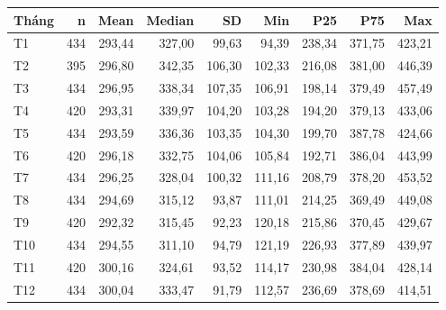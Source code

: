 \begin{tabular}{lrrrrrrrr}
\toprule
Tháng & n & Mean & Median & SD & Min & P25 & P75 & Max \\
\midrule
T1 & 434 & 293{,}44 & 327{,}00 & 99{,}63 & 94{,}39 & 238{,}34 & 371{,}75 & 423{,}21 \\
T2 & 395 & 296{,}80 & 342{,}35 & 106{,}30 & 102{,}33 & 216{,}08 & 381{,}00 & 446{,}39 \\
T3 & 434 & 296{,}95 & 338{,}34 & 107{,}35 & 106{,}91 & 198{,}14 & 379{,}49 & 457{,}49 \\
T4 & 420 & 293{,}31 & 339{,}97 & 104{,}20 & 103{,}28 & 194{,}20 & 379{,}13 & 433{,}06 \\
T5 & 434 & 293{,}59 & 336{,}36 & 103{,}35 & 104{,}30 & 199{,}70 & 387{,}78 & 424{,}66 \\
T6 & 420 & 296{,}18 & 332{,}75 & 104{,}06 & 105{,}84 & 192{,}71 & 386{,}04 & 443{,}99 \\
T7 & 434 & 296{,}25 & 328{,}04 & 100{,}32 & 111{,}16 & 208{,}79 & 378{,}20 & 453{,}52 \\
T8 & 434 & 294{,}69 & 315{,}12 & 93{,}87 & 111{,}01 & 214{,}25 & 369{,}49 & 449{,}08 \\
T9 & 420 & 292{,}32 & 315{,}45 & 92{,}23 & 120{,}18 & 215{,}86 & 370{,}45 & 429{,}67 \\
T10 & 434 & 294{,}55 & 311{,}10 & 94{,}79 & 121{,}19 & 226{,}93 & 377{,}89 & 439{,}97 \\
T11 & 420 & 300{,}16 & 324{,}61 & 93{,}52 & 114{,}17 & 230{,}98 & 384{,}04 & 428{,}14 \\
T12 & 434 & 300{,}04 & 333{,}47 & 91{,}79 & 112{,}57 & 236{,}69 & 378{,}69 & 414{,}51 \\
\bottomrule
\end{tabular}
